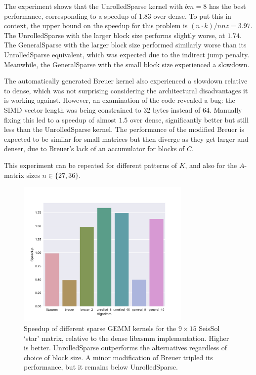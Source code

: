 The experiment shows that the UnrolledSparse kernel with $bm=8$ has the best performance, corresponding to a speedup of $1.83$ over dense. To put this in context, the upper bound on the speedup for this problem is $(n\cdot k)/nnz = 3.97$. The UnrolledSparse with the larger block size performs slightly worse, at $1.74$. The GeneralSparse with the larger block size performed similarly worse than its UnrolledSparse equivalent, which was expected due to the indirect jump penalty. Meanwhile, the GeneralSparse with the small block size experienced a slowdown. 

The automatically generated Breuer kernel also experienced a slowdown relative to dense, which was not surprising considering the architectural disadvantages it is working against. However, an examination of the code revealed a bug: the SIMD vector length was being constrained to 32 bytes instead of 64. Manually fixing this led to a speedup of almost $1.5$ over dense, significantly better but still less than the UnrolledSparse kernel. The performance of the modified Breuer is expected to be similar for small matrices but then diverge as they get larger and denser, due to Breuer's lack of an accumulator for blocks of $C$. 

This experiment can be repeated for different patterns of $K$, and also for the $A$-matrix sizes $n \in \{27, 36\}$. 

  \begin{figure}[bt]
    \centering
      \includegraphics[width=0.75\textwidth]{images/seissol_comparison.pdf}
      \caption{Speedup of different sparse GEMM kernels for the $9\times 15$ SeisSol `star' matrix, relative to the dense libxsmm implementation. Higher is better. UnrolledSparse outperforms the alternatives regardless of choice of block size. A minor modification of Breuer tripled its performance, but it remains below UnrolledSparse. }
      \label{fig:perf_seissol}
  \end{figure}


